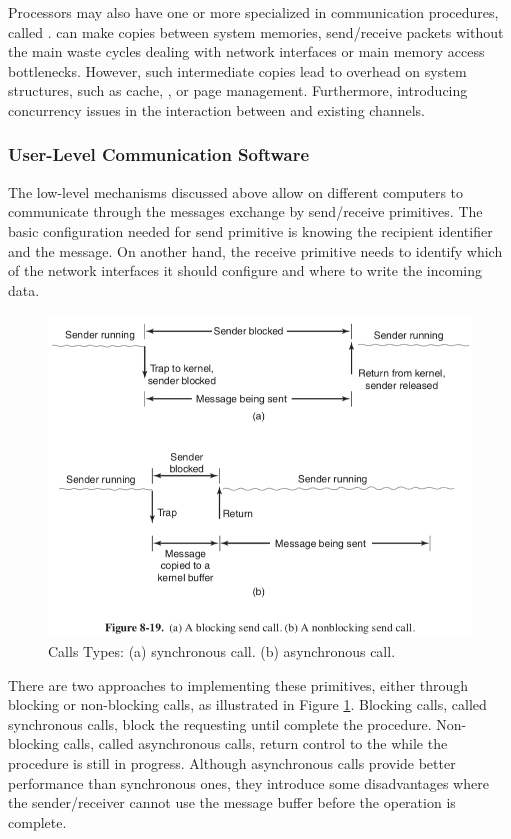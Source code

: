 				Processors may also have one or more \cpus specialized in
				communication procedures, called \dma.
				\dmas can make copies between system memories, send/receive packets
				without the main \cpus waste cycles dealing with network interfaces
				or main memory access bottlenecks.
				However, such intermediate copies lead to overhead on system structures,
				such as cache, \tlb, or page management.
				Furthermore, introducing concurrency issues in the interaction between
				\cpus and existing \dma channels.

			\subsubsection{User-Level Communication Software}
			\label{sec.multicomputers-user-sw}

				The low-level mechanisms discussed above allow \cpus on different
				computers to communicate through the messages exchange by
				send/receive primitives.
				The basic configuration needed for send primitive is knowing the
				recipient identifier and the message.
				On another hand, the receive primitive needs to identify which of
				the network interfaces it should configure and where to write the
				incoming data.

				\begin{figure}[h]
					\centering
					\includegraphics[width=.8\textwidth]{images/calls-types.png}

					\caption{
						Calls Types:
						(a) synchronous call.
						(b) asynchronous call.
					}\par
					\label{fig.calls-types}
				\end{figure}

				There are two approaches to implementing these primitives, either
				through blocking or non-blocking calls, as illustrated in Figure \ref{fig.calls-types}.
				Blocking calls, called synchronous calls, block the requesting \cpu
				until complete the procedure.
				Non-blocking calls, called asynchronous calls, return control to the
				\cpu while the procedure is still in progress.
				Although asynchronous calls provide better performance than
				synchronous ones, they introduce some disadvantages where the sender/receiver
				cannot use the message buffer before the operation is complete.

